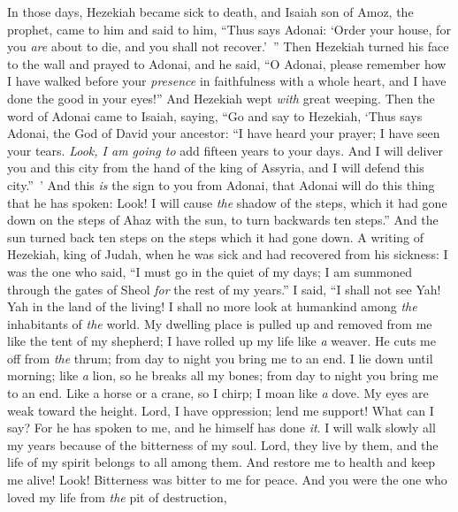 \begin{biblechapter} %
 In those days, Hezekiah became sick to death, and Isaiah son of Amoz, the prophet, came to him and said to him, “Thus says Adonai: ‘Order your house, for you \textit{are} about to die, and you shall not recover.’ ”
\verse Then Hezekiah turned his face to the wall and prayed to Adonai,
\verse and he said, “O Adonai, please remember how I have walked before your \textit{presence} in faithfulness with a whole heart, and I have done the good in your eyes!” And Hezekiah wept \textit{with} great weeping.
\verse Then the word of Adonai came to Isaiah, saying,
\verse “Go and say to Hezekiah, ‘Thus says Adonai, the God of David your ancestor: “I have heard your prayer; I have seen your tears. \textit{Look, I am going to} add fifteen years to your days.
\verse And I will deliver you and this city from the hand of the king of Assyria, and I will defend this city.” ’
\verse And this \textit{is} the sign to you from Adonai, that Adonai will do this thing that he has spoken:
\verse Look! I will cause \textit{the} shadow of the steps, which it had gone down on the steps of Ahaz with the sun, to turn backwards ten steps.” And the sun turned back ten steps on the steps which it had gone down.
\verse A writing of Hezekiah, king of Judah, when he was sick and had recovered from his sickness:
\verse I was the one who said, “I must go in the quiet of my days; 
I am summoned through the gates of Sheol \textit{for} the rest of my years.”
\verse I said, “I shall not see Yah! Yah in the land of the living! 
I shall no more look at humankind among \textit{the} inhabitants of \textit{the} world.
\verse My dwelling place is pulled up and removed from me like the tent of my shepherd; 
I have rolled up my life like \textit{a} weaver. 
He cuts me off from \textit{the} thrum; 
from day to night you bring me to an end.
\verse I lie down until morning; 
like \textit{a} lion, so he breaks all my bones; 
from day to night you bring me to an end.
\verse Like a horse or a crane, so I chirp; 
I moan like \textit{a} dove. 
My eyes are weak toward the height. 
Lord, I have oppression; lend me support!
\verse What can I say? For he has spoken to me, 
and he himself has done \textit{it}. 
I will walk slowly all my years because of the bitterness of my soul.
\verse Lord, they live by them, and the life of my spirit belongs to all among them. 
And restore me to health and keep me alive!
\verse Look! Bitterness was bitter to me for peace. 
And you were the one who loved my life from \textit{the} pit of destruction, 

\end{biblechapter}
